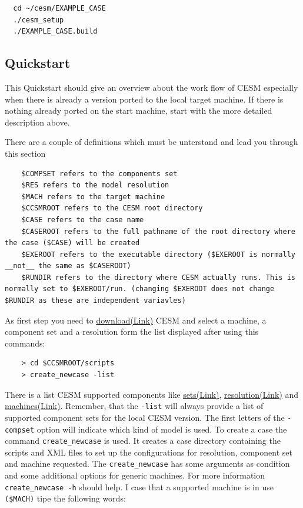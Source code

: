 \documentclass[]{article}
\begin{document}
\begin{verbatim}
  cd ~/cesm/EXAMPLE_CASE
  ./cesm_setup
  ./EXAMPLE_CASE.build
\end{verbatim}

\subsection{Quickstart}\label{quickstart}

This Quickstart should give an overview about the work flow of CESM
especially when there is already a version ported to the local target
machine. If there is nothing already ported on the start machine, start
with the more detailed description above.

There are a couple of definitions which must be unterstand and lead you
through this section

\begin{verbatim}
    $COMPSET refers to the components set
    $RES refers to the model resolution
    $MACH refers to the target machine
    $CCSMROOT refers to the CESM root directory
    $CASE refers to the case name
    $CASEROOT refers to the full pathname of the root directory where the case ($CASE) will be created
    $EXEROOT refers to the executable directory ($EXEROOT is normally __not__ the same as $CASEROOT)
    $RUNDIR refers to the directory where CESM actually runs. This is normally set to $EXEROOT/run. (changing $EXEROOT does not change $RUNDIR as these are independent variavles)
\end{verbatim}

As first step you need to
\href{http://www.cesm.ucar.edu/models/cesm1.2/cesm/doc/usersguide/x290.html}{download(Link)}
CESM and select a machine, a component set and a resolution form the
list displayed after using this commands:

\begin{verbatim}
    > cd $CCSMROOT/scripts
    > create_newcase -list
\end{verbatim}

There is a list CESM supported components like
\href{http://www.cesm.ucar.edu/models/cesm1.2/cesm/doc/modelnl/compsets.html}{sets(Link)},
\href{http://www.cesm.ucar.edu/models/cesm1.2/cesm/doc/modelnl/grid.html}{resolution(Link)}
and
\href{http://www.cesm.ucar.edu/models/cesm1.2/cesm/doc/modelnl/machines.html}{machines(Link)}.
Remember, that the \texttt{-list} will always provide a list of
supported component sets for the local CESM version. The first letters
of the \texttt{-compset} option will indicate which kind of model is
used. To create a case the command \texttt{create\_newcase} is used. It
creates a case directory containing the scripts and XML files to set up
the configurations for resolution, component set and machine requested.
The \texttt{create\_newcase} has some arguments as condition and some
additional options for generic machines. For more information
\texttt{create\_newcase\ -h} should help. I case that a supported
machine is in use \texttt{(\$MACH)} tipe the following words:
\end{document}
